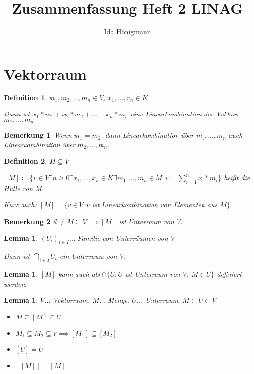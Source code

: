 \documentclass[twocolumn]{article}
\title{Zusammenfassung Heft 2 LINAG}
\author{Ida Hönigmann}
\newtheorem{lemma}[theorem]{Lemma}
\newtheorem{definition}{Definition}[section]
\newtheorem*{remark}{Bemerkung}
\begin{document}
\maketitle

\section{Vektorraum}

\begin{definition}
	$m_1, m_2, ..., m_n \in V$, $x_1,...,x_n \in K$
	
	Dann ist $x_1*m_1+x_2*m_2+...+x_n*m_n$ eine Linearkombination des Vektors $m_1,...,m_n$
\end{definition}

\begin{remark}
	Wenn $m_1=m_2$, dann Linearkombination über $m_1,...,m_n$ auch Linearkombination über $m_2,...,m_n$.
\end{remark}

\begin{definition}
	$M \subseteq V$
	
	$[M]\coloneqq\{v\in V \exists n \geq 0 \exists x_1, ..., x_n \in K \exists m_1, ..., m_n \in M : v=\sum_{i=1}^{n}x_i*m_i\}$ heißt die Hülle von M.
	
	Kurz auch: $[M]=\{v \in V : v$ ist Linearkombination von Elementen aus $M\}$.
\end{definition}

\begin{remark}
	$\emptyset \neq M \subseteq V \implies [M]$ ist Unterraum von $V$.
\end{remark}

\begin{lemma}
	$(U_i)_{i \in I}$... Familie von Unterräumen von $V$
	
	Dann ist $\bigcap_{i \in I} U_i$ ein Unterraum von $V$.
\end{lemma}

\begin{lemma}
	$[M]$ kann auch als $\cap\{U:U$ ist Unterraum von $V$, $M \in U\}$ definiert werden.
\end{lemma}

\begin{lemma}
	$V$... Vektorraum, $M$... Menge, $U$... Unterraum, $M \subset U \subset V$
	
	\begin{itemize}
		\item $M \subseteq [M] \subseteq U$
		\item $M_1 \subseteq M_2 \subseteq V \implies [M_1]\subseteq [M_2]$
		\item $[U]=U$
		\item $[[M]]=[M]$
	\end{itemize}
\end{lemma}
\end{document}
